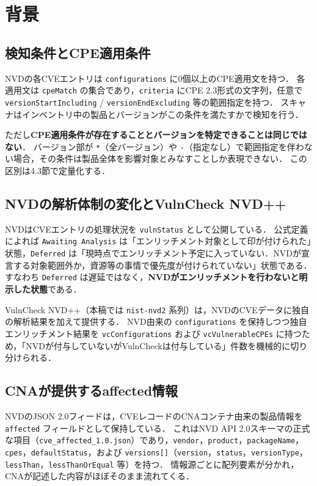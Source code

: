 \section{背景}

\subsection{検知条件とCPE適用条件}

NVDの各CVEエントリは \texttt{configurations} に0個以上のCPE適用文を持つ．
各適用文は \texttt{cpeMatch} の集合であり，\texttt{criteria} にCPE 2.3形式の文字列，任意で \texttt{versionStartIncluding} / \texttt{versionEndExcluding} 等の範囲指定を持つ．
スキャナはインベントリ中の製品とバージョンがこの条件を満たすかで検知を行う．

ただし\textbf{CPE適用条件が存在することとバージョンを特定できることは同じではない}．
バージョン部が \texttt{*}（全バージョン）や \texttt{-}（指定なし）で範囲指定を伴わない場合，その条件は製品全体を影響対象とみなすことしか表現できない．
この区別は4.3節で定量化する．

\subsection{NVDの解析体制の変化とVulnCheck NVD++}

NVDはCVEエントリの処理状況を \texttt{vulnStatus} として公開している\cite{nvd-status}．
公式定義によれば \texttt{Awaiting Analysis} は「エンリッチメント対象として印が付けられた」状態，\texttt{Deferred} は「現時点でエンリッチメント予定に入っていない．NVDが宣言する対象範囲外か，資源等の事情で優先度が付けられていない」状態である．
すなわち \texttt{Deferred} は遅延ではなく，\textbf{NVDがエンリッチメントを行わないと明示した状態}である．

VulnCheck NVD++（本稿では \texttt{nist-nvd2} 系列）\cite{vulncheck-nvd2}は，NVDのCVEデータに独自の解析結果を加えて提供する．
NVD由来の \texttt{configurations} を保持しつつ独自エンリッチメント結果を \texttt{vcConfigurations} および \texttt{vcVulnerableCPEs} に持つため，「NVDが付与していないがVulnCheckは付与している」件数を機械的に切り分けられる．

\subsection{CNAが提供するaffected情報}

NVDのJSON 2.0フィードは，CVEレコードのCNAコンテナ由来の製品情報を \texttt{affected} フィールドとして保持している．
これはNVD API 2.0スキーマの正式な項目（\texttt{cve\_affected\_1.0.json}）であり，\texttt{vendor}，\texttt{product}，\texttt{packageName}，\texttt{cpes}，\texttt{defaultStatus}，および \texttt{versions[]}（\texttt{version}，\texttt{status}，\texttt{versionType}，\texttt{lessThan}，\texttt{lessThanOrEqual} 等）を持つ．
情報源ごとに配列要素が分かれ，CNAが記述した内容がほぼそのまま流れてくる．

